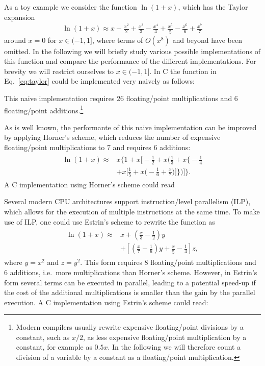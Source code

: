 \documentclass[10pt,DIV16,twocolumn,numbers=noenddot]{scrartcl}
\begin{document}
As a toy example we consider the function $\ln(1+x)$, which has the
Taylor expansion
%
\begin{align}
  \ln(1+x) \approx x - \frac{x^2}{2} + \frac{x^3}{3} - \frac{x^4}{4} + \frac{x^5}{5} - \frac{x^6}{6} + \frac{x^7}{7}
  \label{eq:taylor}
\end{align}
%
around $x=0$ for $x\in(-1,1]$, where terms of $O(x^8)$ and beyond have
been omitted.  In the following we will briefly study various possible
implementations of this function and compare the performance of the
different implementations.  For brevity we will restrict ourselves to
$x\in(-1,1]$.  In C the function in Eq.~\eqref{eq:taylor} could be
implemented very naively as follows:
%

%
This naive implementation requires 26 floating\-/point multiplications
and 6 floating\-/point additions.\footnote{Modern compilers usually
  rewrite expensive floating\-/point divisions by a constant, such as
  $x/2$, as less expensive floating\-/point multiplication by a
  constant, for example as $0.5x$.  In the following we will therefore
  count a division of a variable by a constant as a floating\-/point
  multiplication.}

As is well known, the performante of this naive implementation can be
improved by applying Horner's scheme, which reduces the number of
expensive floating\-/point multiplications to 7 and requires 6
additions:
%
\begin{align}
\begin{split}
  \ln(1+x) \approx{}& x \Bigg\{1 + x \Bigg[-\frac{1}{2} + x \Bigg(\frac{1}{3} + x \Bigg\{-\frac{1}{4} \\
  &+ x \Bigg[\frac{1}{5} + x\Bigg(-\frac{1}{6} + \frac{x}{7}\Bigg)\Bigg]\Bigg\}\Bigg)\Bigg]\Bigg\}.
\end{split}\label{eq:horner}%
\end{align}
%
A C implementation using Horner's scheme could read
%


Several modern CPU architectures support instruction\-/level
parallelism (ILP), which allows for the execution of multiple
instructions at the same time.  To make use of ILP, one could use
Estrin's scheme \cite{estrin} to rewrite the function as
%
\begin{align}
\begin{split}
  \ln(1+x) \approx{}& x + \left(\frac{x}{3}-\frac{1}{2}\right)
    y \\ &+\left[\left(\frac{x}{7}-\frac{1}{6}\right)
    y+\frac{x}{5}-\frac{1}{4}\right] z,
\end{split}\label{eq:estrin}%
\end{align}
%
where $y=x^2$ and $z=y^2$.  This form requires 8 floating\-/point
multiplications and 6 additions, i.e.\ more multiplications than
Horner's scheme.  However, in Estrin's form several terms can be
executed in parallel, leading to a potential speed-up if the cost of
the additional multiplications is smaller than the gain by the
parallel execution.  A C implementation using Estrin's scheme could
read:
%

\end{document}
